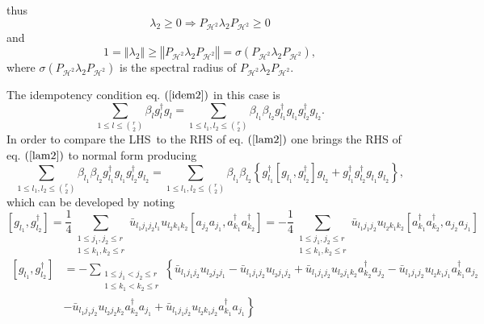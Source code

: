 \documentclass[aps,preprint]{revtex4}%
\begin{document}
thus%
\begin{equation}
\lambda_{2}\geq0\Rightarrow P_{\mathcal{H}^{2}}\lambda_{2}P_{\mathcal{H}^{2}%
}\geq0
\end{equation}
and
\begin{equation}
1=\left\Vert \lambda_{2}\right\Vert \geq\left\Vert P_{\mathcal{H}^{2}}%
\lambda_{2}P_{\mathcal{H}^{2}}\right\Vert =\sigma\left(  P_{\mathcal{H}^{2}%
}\lambda_{2}P_{\mathcal{H}^{2}}\right)  ,
\end{equation}
where $\sigma\left(  P_{\mathcal{H}^{2}}\lambda_{2}P_{\mathcal{H}^{2}}\right)
$ is the spectral radius of $P_{\mathcal{H}^{2}}\lambda_{2}P_{\mathcal{H}^{2}%
}$.

The idempotency condition eq. $\left(  \ref{idem2}\right)  $ in this case is
\begin{equation}
\sum_{1\leq l\leq\binom{r}{2}}\beta_{l}g_{l}^{\dagger}g_{l}=\sum_{1\leq
l_{1},l_{2}\leq\binom{r}{2}}\beta_{l_{1}}\beta_{l_{2}}g_{l_{1}}^{\dagger
}g_{l_{1}}g_{l_{2}}^{\dagger}g_{l_{2}}.\label{lam2}%
\end{equation}
In order to compare the LHS\ to the RHS of eq. $\left(  \ref{lam2}\right)  $
one brings the RHS of  eq. $\left(  \ref{lam2}\right)  $ to normal form
producing
\begin{equation}
\sum_{1\leq l_{1},l_{2}\leq\binom{r}{2}}\beta_{l_{1}}\beta_{l_{2}}g_{l_{1}%
}^{\dagger}g_{l_{1}}g_{l_{2}}^{\dagger}g_{l_{2}}=\sum_{1\leq l_{1},l_{2}%
\leq\binom{r}{2}}\beta_{l_{1}}\beta_{l_{2}}\left\{  g_{l_{1}}^{\dagger}\left[
g_{l_{1}},g_{l_{2}}^{\dagger}\right]  g_{l_{2}}+g_{l_{1}}^{\dagger}g_{l_{2}%
}^{\dagger}g_{l_{1}}g_{l_{2}}\right\}  ,\label{normform}%
\end{equation}
which can be developed by noting
\begin{equation}
\left[  g_{l_{1}}^{{}},g_{l_{2}}^{\dagger}\right]  =\frac{1}{4}\sum
_{\substack{1\leq j_{1},j_{2}\leq r\\1\leq k_{1},k_{2}\leq r}}\bar{u}%
_{l_{1}j_{1}j_{2}l_{1}}u_{l_{2}k_{1}k_{2}}\left[  a_{j_{2}}a_{j_{1}},a_{k_{1}%
}^{\dagger}a_{k_{2}}^{\dagger}\right]  =-\frac{1}{4}\sum_{\substack{1\leq
j_{1},j_{2}\leq r\\1\leq k_{1},k_{2}\leq r}}\bar{u}_{l_{1}j_{1}j_{2}}%
u_{l_{2}k_{1}k_{2}}\left[  a_{k_{1}}^{\dagger}a_{k_{2}}^{\dagger},a_{j_{2}%
}a_{j_{1}}\right]
\end{equation}%
\begin{align}
\left[  g_{l_{1}}^{{}},g_{l_{2}}^{\dagger}\right]   &  =-\sum_{\substack{1\leq
j_{1}<j_{2}\leq r\\1\leq k_{1}<k_{2}\leq r}}\left\{  \bar{u}_{l_{1}j_{1}j_{2}%
}u_{l_{2}j_{2}j_{1}}-\bar{u}_{l_{1}j_{1}j_{2}}u_{l_{2}j_{1}j_{2}}+\bar
{u}_{l_{1}j_{1}j_{2}}u_{l_{2}j_{1}k_{2}}a_{k_{2}}^{\dagger}a_{j_{2}}-\bar
{u}_{l_{1}j_{1}j_{2}}u_{l_{2}k_{1}j_{1}}a_{k_{1}}^{\dagger}a_{j_{2}}\right.
\\
&  \left.  -\bar{u}_{l_{1}j_{1}j_{2}}u_{l_{2}j_{2}k_{2}}a_{k_{2}}^{\dagger
}a_{j_{1}}+\bar{u}_{l_{1}j_{1}j_{2}}u_{l_{2}k_{1}j_{2}}a_{k_{1}}^{\dagger
}a_{j_{1}}\right\}
\end{align}%
\end{document}
